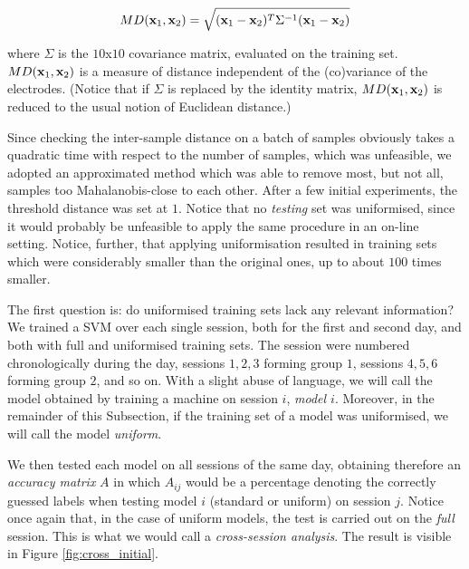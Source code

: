 $$ MD(\mathbf{x}_1,\mathbf{x}_2) = \sqrt{(\mathbf{x}_1-\mathbf{x}_2)^T \Sigma^{-1} (\mathbf{x}_1-\mathbf{x}_2)} $$

\noindent where $\Sigma$ is the $10$x$10$ covariance matrix, evaluated
on the training set. $MD(\mathbf{x}_1,\mathbf{x}_2)$ is a measure of distance
independent of the (co)variance of the electrodes. (Notice that if
$\Sigma$ is replaced by the identity matrix, $MD(\mathbf{x}_1,\mathbf{x}_2)$ is
reduced to the usual notion of Euclidean distance.)

Since checking the inter-sample distance on a batch of samples
obviously takes a quadratic time with respect to the number of
samples, which was unfeasible, we adopted an approximated method which
was able to remove most, but not all, samples too Mahalanobis-close to
each other. After a few initial experiments, the threshold distance
was set at $1$. Notice that no \emph{testing} set was uniformised,
since it would probably be unfeasible to apply the same procedure in
an on-line setting. Notice, further, that applying uniformisation
resulted in training sets which were considerably smaller than the
original ones, up to about $100$ times smaller.

The first question is: do uniformised training sets lack any relevant
information? We trained a SVM over each single session, both for the
first and second day, and both with full and uniformised training
sets. The session were numbered chronologically during the day,
sessions $1,2,3$ forming group $1$, sessions $4,5,6$ forming group
$2$, and so on. With a slight abuse of language, we will call the
model obtained by training a machine on session $i$, \emph{model
$i$}. Moreover, in the remainder of this Subsection, if the training
set of a model was uniformised, we will call the model \emph{uniform}.

We then tested each model on all sessions of the same day, obtaining
therefore an \emph{accuracy matrix} $A$ in which $A_{ij}$ would be a
percentage denoting the correctly guessed labels when testing model
$i$ (standard or uniform) on session $j$. Notice once again that, in
the case of uniform models, the test is carried out on the \emph{full}
session. This is what we would call a \emph{cross-session analysis}.
The result is visible in Figure \ref{fig:cross_initial}.


